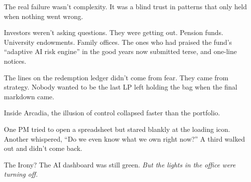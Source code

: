 \medskip


The real failure wasn’t complexity.  It was a blind trust in patterns that only held when nothing went wrong.

Investors weren’t asking questions. They were getting out. Pension funds. University endowments. Family offices. 
The ones who had praised the fund's ``adaptive AI risk engine'' in the good years now submitted terse, and 
one-line notices.

The lines on the redemption ledger didn’t come from fear. They came from strategy. Nobody wanted to be the 
last LP left holding the bag when the final markdown came.

Inside Arcadia, the illusion of control collapsed faster than the portfolio.

One PM tried to open a spreadsheet but stared blankly at the loading icon. Another whispered, 
``Do we even know what we own right now?'' A third walked out and didn’t come back.

The Irony? The AI dashboard was still green. \textit{But the lights in the office were turning off.}

\medskip

